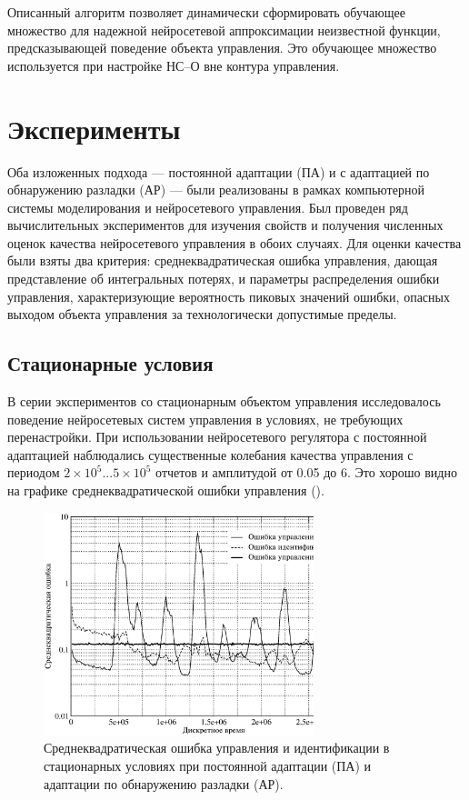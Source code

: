 Описанный алгоритм позволяет динамически сформировать обучающее
множество для надежной нейросетевой аппроксимации неизвестной функции,
предсказывающей поведение объекта управления.  Это обучающее множество
используется при настройке НС--О вне контура управления.

\section{Эксперименты}

Оба изложенных подхода --- постоянной адаптации (ПА) и с адаптацией по
обнаружению разладки (АР) --- были реализованы в рамках компьютерной
системы моделирования и нейросетевого управления.  Был проведен ряд
вычислительных экспериментов для изучения свойств и получения
численных оценок качества нейросетевого управления в обоих случаях.
Для оценки качества были взяты два критерия: среднеквадратическая
ошибка управления, дающая представление об интегральных потерях, и
параметры распределения ошибки управления, характеризующие вероятность
пиковых значений ошибки, опасных выходом объекта управления за
технологически допустимые пределы.

\subsection{Стационарные условия}

В серии экспериментов со стационарным объектом управления
исследовалось поведение нейросетевых систем управления в условиях, не
требующих перенастройки.  При использовании нейросетевого регулятора с
постоянной адаптацией наблюдались существенные колебания качества
управления с периодом $2\times 10^5...5\times 10^5$ отчетов и
амплитудой от 0.05 до 6. Это хорошо видно на графике
среднеквадратической ошибки управления
().

\begin{figure}[h]
\centering
\includegraphics[width=0.7\textwidth,%
  totalheight=0.3\textheight]{perm_adopt_steady_plant_rus}
\caption{Среднеквадратическая ошибка управления и идентификации в
  стационарных условиях при постоянной адаптации (ПА) и адаптации по
  обнаружению разладки (АР).}
\label{fig:steady_plant_errors}
\end{figure}

